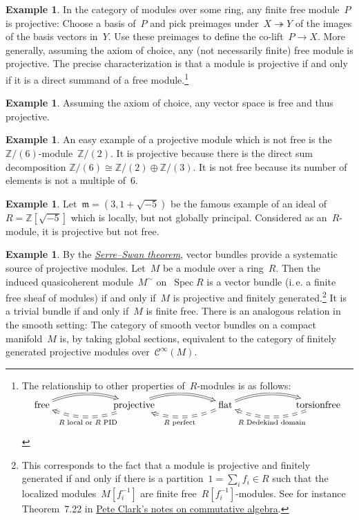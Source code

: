 \documentclass{amsart}
\makeatletter
\theoremstyle{definition}
\newtheorem{ex}[defn]{Example}
\theoremstyle{plain}
\theoremstyle{remark}
\newcommand{\ZZ}{\mathbb{Z}}
\newcommand{\C}{\mathcal{C}}
\newcommand{\mmm}{\mathfrak{m}}
\DeclareMathOperator{\Spec}{Spec}
\newcommand{\?}{\,{:}\,}
\renewcommand{\_}{\mathpunct{.}\,}
\newcommand{\ie}{i.\,e.\@\xspace}
\makeatother
\begin{document}
\begin{ex}In the category of modules over some ring, any finite free module~$P$ is
projective: Choose a basis of~$P$ and pick preimages under~$X
\twoheadrightarrow Y$ of the images of the basis vectors in~$Y$. Use these
preimages to define the co-lift~$P \to X$. More generally, assuming the axiom
of choice, any (not necessarily finite) free module is projective. The precise
characterization is that a module is projective if and only if it is a direct
summand of a free module.\footnote{The relationship to other properties
of~$R$-modules is as follows: \\
\[ \xymatrixcolsep{5pc}\xymatrix{
  \text{free} \ar@/^1pc/@{=>}[r] &
  \text{projective} \ar@/^1pc/@{=>}[r] \ar@/^1pc/@{==>}[l]^{\text{$R$ local
  or $R$ PID}} &
  \text{flat} \ar@/^1pc/@{=>}[r] \ar@/^1pc/@{==>}[l]^{\text{$R$ perfect}} &
  \text{torsionfree} \ar@/^1pc/@{==>}[l]^{\text{$R$ Dedekind domain}}
} \]}\end{ex}

\begin{ex}Assuming the axiom of choice, any vector space is free and thus
projective.\end{ex}

\begin{ex}An easy example of a projective module which is not free is
the~$\ZZ/(6)$-module~$\ZZ/(2)$. It is projective because there is the direct sum
decomposition $\ZZ/(6) \cong \ZZ/(2) \oplus \ZZ/(3)$. It is not free because
its number of elements is not a multiple of~$6$.\end{ex}

\begin{ex}Let~$\mmm = (3, 1 + \sqrt{-5})$ be the famous example of an ideal
of~$R = \ZZ[\sqrt{-5}]$ which is locally, but not globally principal.
Considered as an~$R$-module, it is projective but not free.\end{ex}

\begin{ex}By the
\href{http://ncatlab.org/nlab/show/Serre-Swan+theorem}{\emph{Serre--Swan
theorem}}, vector bundles provide a systematic source of projective modules.
Let~$M$ be a module over a ring~$R$. Then the induced quasicoherent
module~$M^\sim$ on~$\Spec R$ is a vector bundle (\ie a finite free sheaf of
modules) if and only if~$M$ is projective and finitely generated.\footnote{This
corresponds to the fact that a module is projective and finitely generated if
and only if there is a partition~$1 = \sum_i f_i \in R$ such that the localized
modules~$M[f_i^{-1}]$ are finite free~$R[f_i^{-1}]$-modules. See for instance
Theorem~7.22 in \href{http://math.uga.edu/~pete/integral.pdf}{Pete Clark's
notes on commutative algebra}.}
It is a
trivial bundle if and only if~$M$ is finite free. There is an analogous
relation in the smooth setting: The category of smooth vector bundles on a
compact manifold~$M$ is, by taking global sections, equivalent to the category
of finitely generated projective modules over~$\C^\infty(M)$.
\end{ex}
\end{document}
